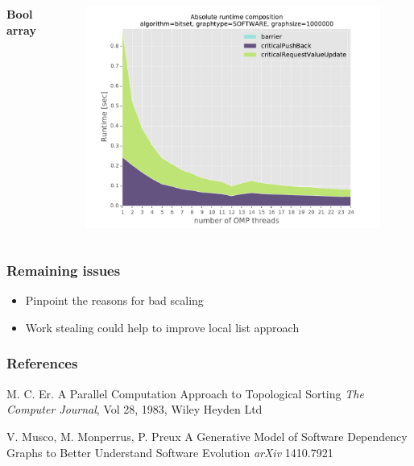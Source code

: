 \begin{frame}
\begin{columns}[T]
  \bfseries{Bool array}
  \begin{figure}[!ht]
    \begin{center}
      \includegraphics[width=\textwidth]{img/timeabs_bitset_gtSOFTWARE_s1000000_opt1.pdf}
    \end{center}
  \end{figure}
\end{columns}
 
\end{frame}



\begin{frame}
 \frametitle{Remaining issues}
 \begin{itemize}
	 \item Pinpoint the reasons for bad scaling
	 \item Work stealing could help to improve local list approach
 \end{itemize}
\end{frame}



\begin{frame}
\frametitle{References}
\footnotesize{
\begin{thebibliography}{999} %

	 M. C. Er.
		\newblock A Parallel Computation Approach to Topological Sorting
		\newblock \emph{The Computer Journal}, Vol 28, 1983, Wiley Heyden Ltd	
	
	 V. Musco, M. Monperrus, P. Preux
		\newblock A Generative Model of Software Dependency Graphs to Better Understand Software Evolution
		\newblock \emph{arXiv} 1410.7921

\end{thebibliography}
}
\end{frame}


 
